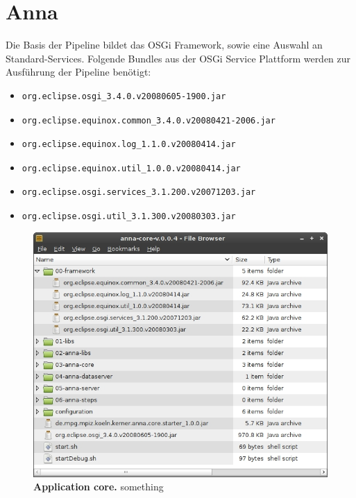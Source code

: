 \section{Anna}
Die Basis der Pipeline bildet das OSGi Framework, sowie
eine Auswahl an Standard-Services.
Folgende Bundles aus der OSGi Service Plattform werden zur Ausführung der
Pipeline benötigt:
\begin{itemize}
  \item
  \begin{verbatim}org.eclipse.osgi_3.4.0.v20080605-1900.jar\end{verbatim}
  \item
  \begin{verbatim}org.eclipse.equinox.common_3.4.0.v20080421-2006.jar\end{verbatim}
  \item
  \begin{verbatim}org.eclipse.equinox.log_1.1.0.v20080414.jar\end{verbatim}
  \item
  \begin{verbatim}org.eclipse.equinox.util_1.0.0.v20080414.jar\end{verbatim}
  \item
  \begin{verbatim}org.eclipse.osgi.services_3.1.200.v20071203.jar\end{verbatim}
  \item
  \begin{verbatim}org.eclipse.osgi.util_3.1.300.v20080303.jar\end{verbatim}
\end{itemize}

\begin{figure}[p]
	\begin{center}
		\includegraphics[scale=0.68]{pics/anna_folder_framework.jpg}
	\caption[Application core]{
	\textbf{Application core.}
	something}
	\end{center}
	\label{fig:anna_folder_framework}
\end{figure}

